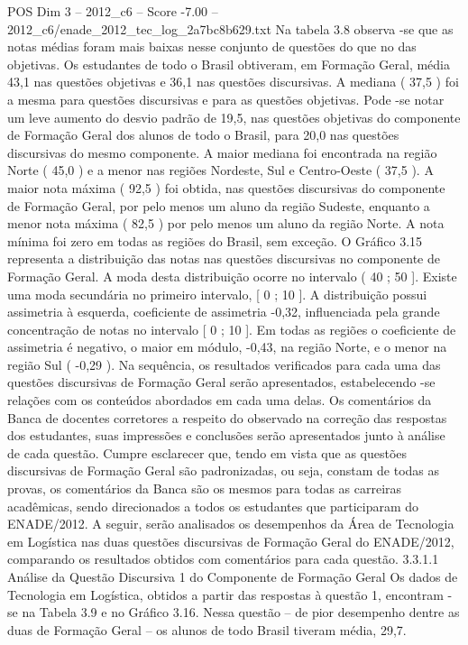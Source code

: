 \begin{textsample}{POS Dim 3 – 2012\_c6 – Score -7.00 – 2012\_c6/enade\_2012\_tec\_log\_2a7bc8b629.txt}
Na tabela 3.8 observa -se que as notas médias foram mais baixas nesse conjunto de questões do que no das objetivas.
Os estudantes de todo o Brasil obtiveram, em Formação Geral, média 43,1 nas questões objetivas e 36,1 nas questões discursivas.
A mediana ( 37,5 ) foi a mesma para questões discursivas e para as questões objetivas.
Pode -se notar um leve aumento do desvio padrão de 19,5, nas questões objetivas do componente de Formação Geral dos alunos de todo o Brasil, para 20,0 nas questões discursivas do mesmo componente.
A maior mediana foi encontrada na região Norte ( 45,0 ) e a menor nas regiões Nordeste, Sul e Centro-Oeste ( 37,5 ).
A maior nota máxima ( 92,5 ) foi obtida, nas questões discursivas do componente de Formação Geral, por pelo menos um aluno da região Sudeste, enquanto a menor nota máxima ( 82,5 ) por pelo menos um aluno da região Norte.
A nota mínima foi zero em todas as regiões do Brasil, sem exceção.
O Gráfico 3.15 representa a distribuição das notas nas questões discursivas no componente de Formação Geral.
A moda desta distribuição ocorre no intervalo ( 40 ; 50 ].
Existe uma moda secundária no primeiro intervalo, [ 0 ; 10 ].
A distribuição possui assimetria à esquerda, coeficiente de assimetria -0,32, influenciada pela grande concentração de notas no intervalo [ 0 ; 10 ].
Em todas as regiões o coeficiente de assimetria é negativo, o maior em módulo, -0,43, na região Norte, e o menor na região Sul ( -0,29 ).
Na sequência, os resultados verificados para cada uma das questões discursivas de Formação Geral serão apresentados, estabelecendo -se relações com os conteúdos abordados em cada uma delas.
Os comentários da Banca de docentes corretores a respeito do observado na correção das respostas dos estudantes, suas impressões e conclusões serão apresentados junto à análise de cada questão.
Cumpre esclarecer que, tendo em vista que as questões discursivas de Formação Geral são padronizadas, ou seja, constam de todas as provas, os comentários da Banca são os mesmos para todas as carreiras acadêmicas, sendo direcionados a todos os estudantes que participaram do ENADE/2012.
A seguir, serão analisados os desempenhos da Área de Tecnologia em Logística nas duas questões discursivas de Formação Geral do ENADE/2012, comparando os resultados obtidos com comentários para cada questão. 3.3.1.1 Análise da Questão Discursiva 1 do Componente de Formação Geral Os dados de Tecnologia em Logística, obtidos a partir das respostas à questão 1, encontram -se na Tabela 3.9 e no Gráfico 3.16.
Nessa questão – de pior desempenho dentre as duas de Formação Geral – os alunos de todo Brasil tiveram média, 29,7.

\end{textsample}
